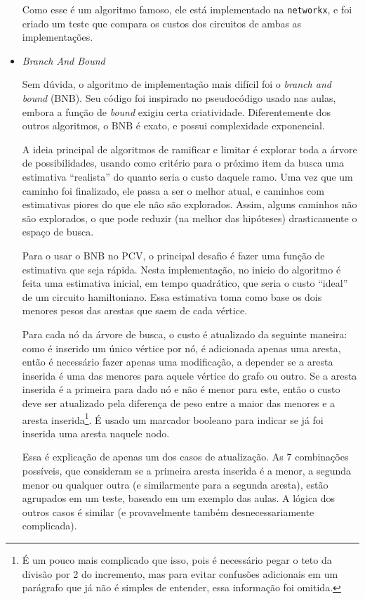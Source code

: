 \documentclass{article}
\begin{document}
\begin{itemize}
	      Como esse é um algoritmo famoso, ele está implementado na \texttt{networkx}, e foi criado um teste que compara os custos dos circuitos de ambas as implementações.

	\item \textit{Branch And Bound}

	      Sem dúvida, o algoritmo de implementação mais difícil foi o \textit{branch and bound} (BNB). Seu código foi inspirado no pseudocódigo usado nas aulas, embora a função de \textit{bound} exigiu certa criatividade. Diferentemente dos outros algoritmos, o BNB é exato, e possui complexidade exponencial.

	      A ideia principal de algoritmos de ramificar e limitar é explorar toda a árvore de possibilidades, usando como critério para o próximo item da busca uma estimativa ``realista'' do quanto seria o custo daquele ramo. Uma vez que um caminho foi finalizado, ele passa a ser o melhor atual, e caminhos com estimativas piores do que ele não são explorados. Assim, alguns caminhos não são explorados, o que pode reduzir (na melhor das hipóteses) drasticamente o espaço de busca.

	      Para o usar o BNB no PCV, o principal desafio é fazer uma função de estimativa que seja rápida. Nesta implementação, no inicio do algoritmo é feita uma estimativa inicial, em tempo quadrático, que seria o custo ``ideal'' de um circuito hamiltoniano. Essa estimativa toma como base os dois menores pesos das arestas que saem de cada vértice.

	      Para cada nó da árvore de busca, o custo é atualizado da seguinte maneira: como é inserido um único vértice por nó, é adicionada apenas uma aresta, então é necessário fazer apenas uma modificação, a depender se a aresta inserida é uma das menores para aquele vértice do grafo ou outro. Se a aresta inserida é a primeira para dado nó e não é menor para este, então o custo deve ser atualizado pela diferença de peso entre a maior das menores e a aresta inserida\footnote{É um pouco mais complicado que isso, pois é necessário pegar o teto da divisão por 2 do incremento, mas para evitar confusões adicionais em um parágrafo que já não é simples de entender, essa informação foi omitida.}. É usado um marcador booleano para indicar se já foi inserida uma aresta naquele nodo.

	      Essa é explicação de apenas um dos casos de atualização. As 7 combinações possíveis, que consideram se a primeira aresta inserida é a menor, a segunda menor ou qualquer outra (e similarmente para a segunda aresta), estão agrupados em um teste, baseado em um exemplo das aulas. A lógica dos outros casos é similar (e provavelmente também desnecessariamente complicada).


\end{itemize}
\end{document}
